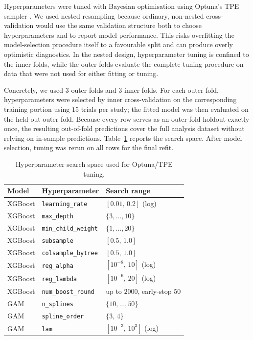 \documentclass[12pt]{article}
\begin{document}
Hyperparameters were tuned with Bayesian optimisation \citep{snoek2012bayesian} using Optuna's TPE sampler \citep{akiba2019optuna,bergstra2011algorithms}. We used nested resampling \citep{bischl2023hpo,cawley2010overfitting} because ordinary, non-nested cross-validation would use the same validation structure both to choose hyperparameters and to report model performance. This risks overfitting the model-selection procedure itself to a favourable split and can produce overly optimistic diagnostics. In the nested design, hyperparameter tuning is confined to the inner folds, while the outer folds evaluate the complete tuning procedure on data that were not used for either fitting or tuning.

Concretely, we used $3$ outer folds and $3$ inner folds. For each outer fold, hyperparameters were selected by inner cross-validation on the corresponding training portion using $15$ trials per study; the fitted model was then evaluated on the held-out outer fold. Because every row serves as an outer-fold holdout exactly once, the resulting out-of-fold predictions cover the full analysis dataset without relying on in-sample predictions. Table~\ref{tab:hyperparameter_search_space} reports the search space. After model selection, tuning was rerun on all rows for the final refit.

\begin{table}[H]
  \centering
  \caption{Hyperparameter search space used for Optuna/TPE tuning.}
  \label{tab:hyperparameter_search_space}
  \small
  \renewcommand{\arraystretch}{1.12}
  \begin{tabular}{@{}p{}p{}p{}@{}}
    \toprule
    \textbf{Model} & \textbf{Hyperparameter} & \textbf{Search range} \\
    \midrule
    XGBoost & \texttt{learning\_rate} & $[0.01,\,0.2]$ (log) \\
    XGBoost & \texttt{max\_depth} & $\{3,\dots,10\}$ \\
    XGBoost & \texttt{min\_child\_weight} & $\{1,\dots,20\}$ \\
    XGBoost & \texttt{subsample} & $[0.5,\,1.0]$ \\
    XGBoost & \texttt{colsample\_bytree} & $[0.5,\,1.0]$ \\
    XGBoost & \texttt{reg\_alpha} & $[10^{-8},\,10]$ (log) \\
    XGBoost & \texttt{reg\_lambda} & $[10^{-6},\,20]$ (log) \\
    XGBoost & \texttt{num\_boost\_round} & up to $2000$, early-stop $50$ \\
    GAM & \texttt{n\_splines} & $\{10,\dots,50\}$ \\
    GAM & \texttt{spline\_order} & $\{3,\,4\}$ \\
    GAM & \texttt{lam} & $[10^{-3},\,10^{3}]$ (log) \\
    \bottomrule
  \end{tabular}
\end{table}
\end{document}
